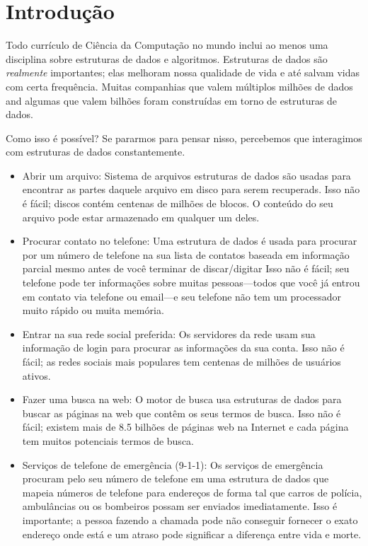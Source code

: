 \chapter{Introdução}
Todo currículo de Ciência da Computação no mundo inclui ao menos uma disciplina sobre estruturas de dados e algoritmos.
Estruturas de dados são \emph{realmente} importantes;
elas melhoram nossa qualidade de vida e até salvam vidas com certa frequência.
Muitas companhias que valem múltiplos milhões de dados and algumas que valem bilhões foram construídas em torno de estruturas de dados.

Como isso é possível? Se pararmos para pensar nisso, percebemos que interagimos com estruturas de dados constantemente.

\begin{itemize}
  \item  Abrir um arquivo: Sistema de arquivos 
    estruturas de dados são usadas para encontrar
    as partes daquele arquivo em disco para serem recuperads.
    Isso não é fácil; discos contém centenas de milhões de blocos.
    O conteúdo do seu arquivo pode estar armazenado em qualquer um deles.
  \item Procurar contato no telefone: Uma estrutura de dados é usada para procurar por um número de telefone na sua lista de contatos 
    baseada em informação parcial mesmo antes de você terminar de discar/digitar
    Isso não é fácil;
seu telefone pode ter informações sobre muitas pessoas---todos que você já entrou em contato via telefone ou email---e seu telefone não tem um processador muito rápido ou muita memória.
  \item Entrar na sua rede social preferida:
    Os servidores da rede
    usam sua informação de login para procurar as informações da sua conta.
    Isso não é fácil; as redes sociais mais populares tem centenas de milhões de usuários ativos.
  \item Fazer uma busca na web: 
    O motor de busca usa estruturas de dados para buscar
    as páginas na web que contêm os seus termos de busca.
    Isso não é fácil; existem mais de 8.5 bilhões de páginas web na Internet
    e cada página tem muitos potenciais termos de busca.
  \item Serviços de telefone de emergência (9-1-1):
    Os serviços de emergência procuram pelo seu número de telefone em uma estrutura de dados que mapeia números de telefone para endereços de forma tal que carros de polícia, ambulâncias ou os bombeiros possam ser enviados imediatamente.
    Isso é importante; a pessoa fazendo a chamada pode não conseguir fornecer o exato endereço onde está e um atraso pode significar a diferença entre vida e morte.
\end{itemize}

